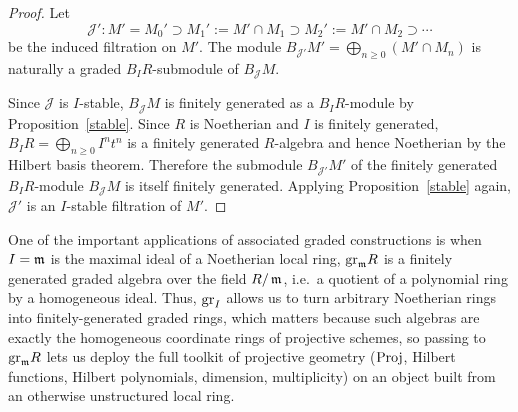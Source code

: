 \documentclass[12pt]{amsproc}
\begin{document}
    \begin{proof}
        Let 
        \[\mathcal{J}' : M' = M_0' \supset M_1' := M' \cap M_1 \supset M_2' 
        := M' \cap M_2 \supset \cdots\]
        be the induced filtration on $M'$. The module $B_{\mathcal{J}'}M' = 
        \bigoplus_{n \geq 0} (M' \cap M_n)$ is naturally a graded 
        $B_I R$-submodule of $B_{\mathcal{J}}M$. 
        

        Since $\mathcal{J}$ is $I$-stable, $B_{\mathcal{J}}M$ is finitely 
        generated as a $B_I R$-module by Proposition~\ref{stable}. Since $R$ is 
        Noetherian and $I$ is finitely generated, $B_I R = \bigoplus_{n \geq 
        0} I^n t^n$ is a finitely generated $R$-algebra and hence Noetherian 
        by the Hilbert basis theorem. Therefore the submodule 
        $B_{\mathcal{J}'}M'$ of the finitely generated $B_I R$-module 
        $B_{\mathcal{J}}M$ is itself finitely generated. Applying Proposition~\ref{stable} again, $\mathcal{J}'$ is an $I$-stable filtration of $M'$. 
    \end{proof}
    
    \begin{remark}
        One of the important applications of associated graded constructions is when $I = \operatorname{\mathfrak{m}}$ is the maximal ideal of a Noetherian local ring, $\text{gr}_{\operatorname{\mathfrak{m}}} R$ is a finitely generated {graded} algebra over the field $R/\operatorname{\mathfrak{m}}$, i.e.\ a quotient of a polynomial ring by a homogeneous ideal. Thus, $\text{gr}_I$ allows us to turn arbitrary Noetherian rings into finitely-generated graded rings, which matters because such algebras are exactly the homogeneous coordinate rings of projective schemes, so passing to $\text{gr}_{\operatorname{\mathfrak{m}}} R$ lets us deploy the full toolkit of projective geometry ($\text{Proj}$, Hilbert functions, Hilbert polynomials, dimension, multiplicity) on an object built from an otherwise unstructured local ring. 
        
    \end{remark}
\end{document}
